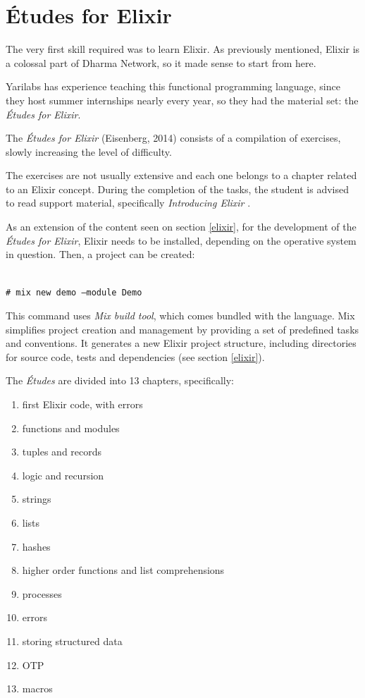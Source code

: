 \section{Études for Elixir}

The very first skill required was to learn Elixir. As previously mentioned, Elixir is a colossal part of Dharma Network, so it made sense to start from here.

Yarilabs has experience teaching this functional programming language, since they host summer internships nearly every year, so they had the material set: the \textit{Études for Elixir}.

The \emph{Études for Elixir} (Eisenberg, 2014) consists of a compilation of exercises, slowly increasing the level of difficulty. 

The exercises are not usually extensive and each one belongs to a chapter related to an Elixir concept. During the completion of the tasks, the student is advised to read support material, specifically \emph{Introducing Elixir} \cite{elixir}.\newline

As an extension of the content seen on section \ref{elixir}, for the development of the \textit{Études for Elixir}, Elixir needs to be installed, depending on the operative system in question. Then, a project can be created: \newline

{
\newcommand{\shellcmd}[1]{\\\indent\indent\texttt{\footnotesize\# #1}\\}
  \shellcmd{mix new demo --module Demo}
}

This command uses \textit{Mix build tool}, which comes bundled with the language. Mix simplifies project creation and management by providing a set of predefined tasks and conventions. It generates a new Elixir project structure, including directories for source code, tests and dependencies (see section \ref{elixir}). \newline

The \textit{Études} are divided into 13 chapters, specifically:

\begin{enumerate}

    \item first Elixir code, with errors
    \item functions and modules
    \item tuples and records
    \item logic and recursion
    \item strings
    \item lists
    \item hashes
    \item higher order functions and list comprehensions
    \item processes
    \item errors
    \item storing structured data
    \item OTP
    \item macros
    
\end{enumerate}

